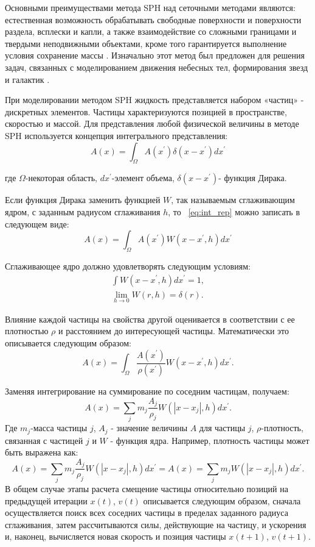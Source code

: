 Основными преимуществами метода SPH над сеточными методами являются: естественная возможность обрабатывать свободные поверхности и поверхности раздела, всплески и капли, а также взаимодействие со сложными границами и твердыми неподвижными объектами, кроме того гарантируется выполнение условия сохранение массы \cite {Müller2003, Müller2005, Keiser2005, Solenthaler2007, Solenthaler2008, Becker2007}. Изначально этот метод был предложен для решения задач, связанных с моделированием движения небесных тел, формирования звезд и галактик \cite{Gingold1977, Lucy1977}.

При моделировании методом SPH жидкость представляется набором «частиц» - дискретных элементов. Частицы характеризуются позицией в пространстве, скоростью и массой. Для представления любой физической величины  в методе SPH используется концепция интегрального представления:
\begin{equation}
\label{eq:int_rep}
A(x) = \int_{\Omega}A(x^{'})\delta (x-x^{'})dx^{'}
\end{equation}

где \(\Omega\)-некоторая область, \(dx^{'}\)-элемент объема, \(\delta (x-x^{'})\)- функция Дирака.

Если функция Дирака заменить функцией \(W\), так называемым сглаживающим ядром, с заданным радиусом сглаживания \(h\), то ~\ref{eq:int_rep} можно записать в следующем виде:
\[
A(x) = \int_{\Omega}A(x^{'})W(x-x^{'}, h)dx^{'}
\]

Сглаживающее ядро должно удовлетворять следующим условиям:
\begin{align}
\int W(x-x^{'},h)dx^{'}=1, \nonumber \\
\lim_{h\rightarrow0}W(r, h) = \delta (r). \nonumber
\end{align}

Влияние каждой частицы на свойства другой оценивается в соответствии с ее плотностью \(\rho\) и расстоянием до интересующей частицы. Математически это описывается следующим образом:
\[
A(x)=\int_{\Omega}\frac{A(x^{'})}{\rho(x^{'})}W(x-x^{'},h)dx^{'}.
\]

Заменяя интегрирование  на суммирование по соседним частицам, получаем:
\[
A(x)=\sum_{j}m_j\frac{A_j}{\rho_j}W(\left | x-x_{j} \right |,h)dx^{'}.
\]
Где \(m_j\)-масса частицы \(j\), \(A_j\) - значение величины \(A\) для частицы \(j\), \(\rho\)-плотность, связанная с частицей \(j\) и \(W\) - функция ядра. Например, плотность частицы может быть выражена как:
\[
A(x)=\sum_{j}m_j\frac{A_j}{\rho_j}W(\left | x-x_{j} \right |,h)dx^{'}=A(x)=\sum_{j}m_jW(\left | x-x_{j} \right |,h)dx^{'}.
\]
В общем случае этапы расчета смещение частицы относительно позиций на предыдущей итерации \(x(t)\), \(v(t)\) описывается следующим образом, сначала осуществляется поиск всех соседних частицы в пределах заданного радиуса сглаживания, затем рассчитываются силы, действующие на частицу, и ускорения и, наконец, вычисляется новая скорость и позиция частицы \(x(t+1)\), \(v(t+1)\).


